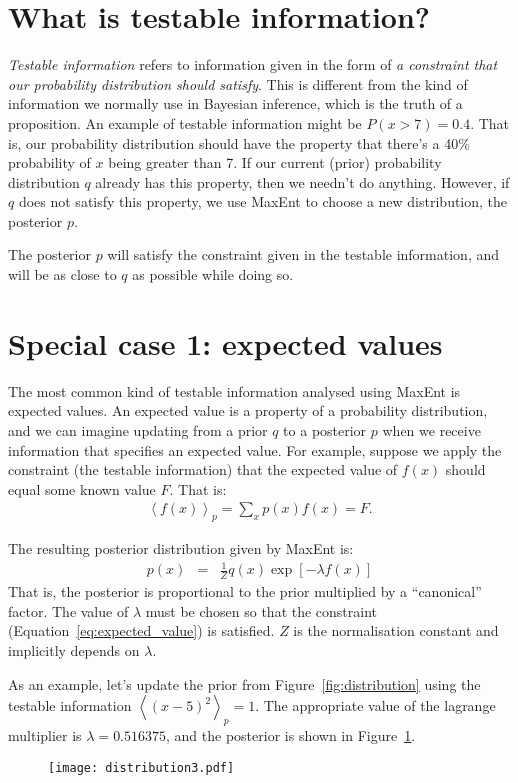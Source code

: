 \documentclass[a4paper, 11pt]{article}
\begin{document}
\section{What is testable information?}
{\it Testable information} refers to information given in the form of
{\it a constraint that our probability distribution should satisfy}. This is
different from the kind of information we normally use in Bayesian inference,
which is the truth of a proposition. An example of testable information
might be $P(x > 7) = 0.4$. That is, our probability distribution should have
the property that there's a 40\% probability of $x$ being greater than 7.
If our current (prior) probability distribution $q$ already has this property,
then we needn't do anything. However, if $q$ does not satisfy this property,
we use MaxEnt to choose a new distribution, the posterior $p$.

The posterior $p$ will satisfy the constraint given in the testable information,
and will be as close to $q$ as possible while doing so.



\section{Special case 1: expected values}\label{sec:expectations}
The most common kind of testable information analysed using MaxEnt is
expected values. An expected value is a property of a probability distribution,
and we can imagine updating from a prior $q$ to a posterior
$p$ when we receive information that specifies an expected value.
For example, suppose we apply the constraint (the testable information)
that the expected value of $f(x)$ should equal some known value $F$. That is:
\begin{eqnarray}
\left<f(x)\right>_p = \sum_x p(x)f(x) = F.\label{eq:expected_value}
\end{eqnarray}

The resulting posterior distribution given by MaxEnt is:
\begin{eqnarray}
p(x) &=& \frac{1}{Z}q(x)\exp\left[-\lambda f(x)\right] 
\end{eqnarray}
That is, the posterior is proportional to the prior multiplied by a
``canonical'' factor. The value of $\lambda$ must be chosen so that
the constraint (Equation~\ref{eq:expected_value}) is satisfied. $Z$ is the
normalisation constant and implicitly depends on $\lambda$.

As an example, let's update the prior from Figure~\ref{fig:distribution}
using the testable information $\left<(x - 5)^2\right>_p = 1$. The appropriate
value of the lagrange multiplier is $\lambda=0.516375$, and the posterior is
shown in Figure~\ref{fig:distribution3}.
\begin{figure}
\begin{center}
\texttt{[image: distribution3.pdf]}
\caption{\label{fig:distribution3}}
\end{center}
\end{figure}
\end{document}
